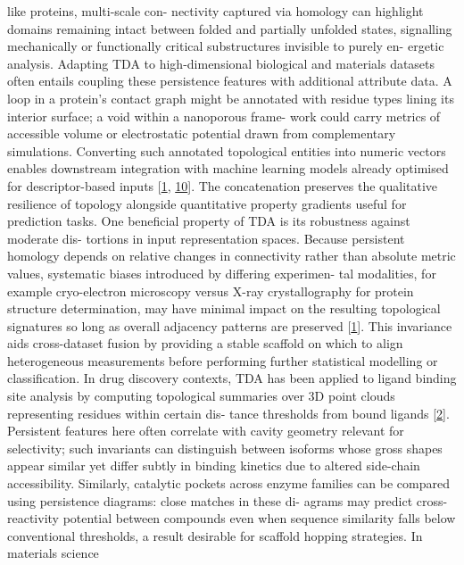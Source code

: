 \documentclass[
]{article}
\begin{document}
like proteins, multi-scale con- nectivity captured via homology can
highlight domains remaining intact between folded and partially unfolded
states, signalling mechanically or functionally critical substructures
invisible to purely en- ergetic analysis. Adapting TDA to
high-dimensional biological and materials datasets often entails
coupling these persistence features with additional attribute data. A
loop in a protein's contact graph might be annotated with residue types
lining its interior surface; a void within a nanoporous frame- work
could carry metrics of accessible volume or electrostatic potential
drawn from complementary simulations. Converting such annotated
topological entities into numeric vectors enables downstream integration
with machine learning models already optimised for descriptor-based
inputs {[}\protect\hyperlink{_bookmark41}{1},
\protect\hyperlink{_bookmark50}{10}{]}. The concatenation preserves the
qualitative resilience of topology alongside quantitative property
gradients useful for prediction tasks. One beneficial property of TDA is
its robustness against moderate dis- tortions in input representation
spaces. Because persistent homology depends on relative changes in
connectivity rather than absolute metric values, systematic biases
introduced by differing experimen- tal modalities, for example
cryo-electron microscopy versus X-ray crystallography for protein
structure determination, may have minimal impact on the resulting
topological signatures so long as overall adjacency patterns are
preserved {[}\protect\hyperlink{_bookmark41}{1}{]}. This invariance aids
cross-dataset fusion by providing a stable scaffold on which to align
heterogeneous measurements before performing further statistical
modelling or classification. In drug discovery contexts, TDA has been
applied to ligand binding site analysis by computing topological
summaries over 3D point clouds representing residues within certain dis-
tance thresholds from bound ligands
{[}\protect\hyperlink{_bookmark42}{2}{]}. Persistent features here often
correlate with cavity geometry relevant for selectivity; such invariants
can distinguish between isoforms whose gross shapes appear similar yet
differ subtly in binding kinetics due to altered side-chain
accessibility. Similarly, catalytic pockets across enzyme families can
be compared using persistence diagrams: close matches in these di-
agrams may predict cross-reactivity potential between compounds even
when sequence similarity falls below conventional thresholds, a result
desirable for scaffold hopping strategies. In materials science
\end{document}
